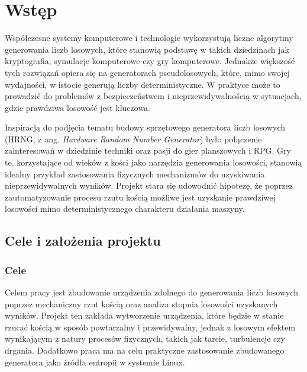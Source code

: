 \chapter{Wstęp}\label{ch:wstep}


Współczesne systemy komputerowe i technologie wykorzystują liczne algorytmy generowania liczb losowych, które stanowią podstawę w takich dziedzinach jak kryptografia,
symulacje komputerowe czy gry komputerowe.
Jednakże większość tych rozwiązań opiera się na generatorach pseudolosowych,
które, mimo swojej wydajności, w istocie generują liczby deterministyczne.
W praktyce może to prowadzić do problemów z bezpieczeństwem i nieprzewidywalnością w sytuacjach, gdzie prawdziwa losowość jest kluczowa.

Inspiracją do podjęcia tematu budowy sprzętowego generatora liczb losowych (HRNG, z ang. \textit{Hardware Random Number Generator})
było połączenie zainteresowań w dziedzinie techniki oraz pasji do gier planszowych i RPG. %
Gry te, korzystające od wieków z kości jako narzędzia generowania losowości, stanowią idealny przykład zastosowania fizycznych mechanizmów do uzyskiwania nieprzewidywalnych wyników.
Projekt stara się udowodnić hipotezę, że poprzez zautomatyzowanie procesu rzutu kością możliwe jest uzyskanie prawdziwej losowości mimo deterministycznego charakteru działania maszyny.

\section{Cele i założenia projektu}\label{sec:cel-projektu}
\subsection{Cele}

Celem pracy jest zbudowanie urządzenia zdolnego do generowania liczb losowych poprzez mechaniczny rzut kością oraz analiza stopnia losowości uzyskanych wyników.
Projekt ten zakłada wytworzenie urządzenia, które będzie w stanie rzucać kością w sposób powtarzalny i przewidywalny,
jednak z losowym efektem wynikającym z natury procesów fizycznych, takich jak tarcie, turbulencje czy drgania.
Dodatkowo praca ma na celu praktyczne zastosowanie zbudowanego generatora jako źródła entropii w systemie Linux.

